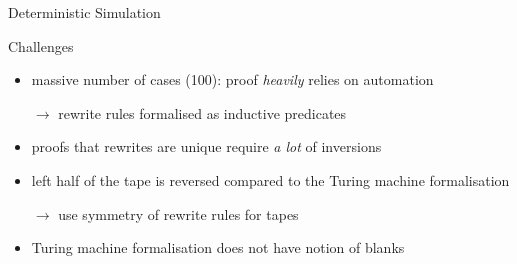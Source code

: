 \documentclass[11pt,usenames,dvipsnames,
hyperref={pdfencoding=auto,psdextra}]{beamer}
\begin{document}
\begin{frame}{Deterministic Simulation}
{\begin{center}
  \end{center}
}

\end{frame}

\begin{frame}{Challenges}
  \begin{itemize}
    \item massive number of cases (100): proof \emph{heavily} relies on automation

      $\rightarrow$ rewrite rules formalised as inductive predicates
    \item proofs that rewrites are unique require \emph{a lot} of inversions
    \item left half of the tape is reversed compared to the Turing machine formalisation

      $\rightarrow$ use symmetry of rewrite rules for tapes
    \item Turing machine formalisation does not have notion of blanks
  \end{itemize}
\end{frame}
\end{document}
